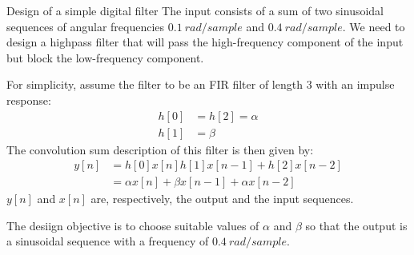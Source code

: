 \documentclass[../../main/main.tex]{subfiles}
\begin{document}
\begin{example}{Design of a simple digital filter}{}
    The input consists of a sum of two sinusoidal sequences of angular frequencies \( 0.1 \ \si{rad/sample} \) and \( 0.4 \ \si{rad/sample} \). We need to design a highpass filter that will pass the high-frequency component of the input but block the low-frequency component.

    For simplicity, assume the filter to be an FIR filter of length 3 with an impulse response:
    \begin{align}
        h[0] &= h[2] = \alpha \\
        h[1] &= \beta
    \end{align}
    The convolution sum description of this filter is then given by:
    \begin{align}
        y[n]
        &=
            h[0]x[n]  h[1]x[n-1] + h[2]x[n-2]   \nonumber   \\
        &=
            \alpha x[n] + \beta x[n-1] + \alpha x[n-2]
    \end{align}
    \( y[n] \) and \( x[n] \) are, respectively, the output and the input sequences.

    The desiign objective is to choose suitable values of \( \alpha \) and \( \beta \) so that the output is a sinusoidal sequence with a frequency of \( 0.4 \ \si{rad/sample} \).


\end{example}
\end{document}

